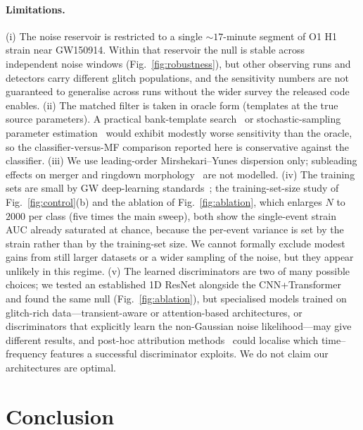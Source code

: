 \documentclass[11pt,a4paper]{article}
\begin{document}
\paragraph{Limitations.}\label{sec:limitations}
(i) The noise reservoir is restricted to a single $\sim 17$-minute
segment of O1 H1 strain near GW150914. Within that reservoir the null is
stable across independent noise windows (Fig.~\ref{fig:robustness}), but
other observing runs and detectors carry different glitch populations, and
the sensitivity numbers are not guaranteed to generalise across runs
without the wider survey the released code enables.
(ii) The matched filter is taken in oracle form (templates at the true
source parameters). A practical bank-template search~\cite{Usman2016_PyCBC}
or stochastic-sampling parameter estimation~\cite{Ashton2019} would
exhibit modestly worse sensitivity than the oracle, so the
classifier-versus-MF comparison reported here is conservative against
the classifier.
(iii) We use leading-order Mirshekari--Yunes dispersion only; subleading
effects on merger and ringdown morphology~\cite{YunesPretorius2009} are
not modelled.
(iv) The training sets are small by GW deep-learning
standards~\cite{GeorgeHuerta2018,Gabbard2018}; the training-set-size study
of Fig.~\ref{fig:control}(b) and the ablation of Fig.~\ref{fig:ablation},
which enlarges $N$ to $2000$ per class (five times the main sweep), both
show the single-event strain AUC already saturated at chance, because the
per-event variance is set by the strain rather than by the training-set
size. We cannot formally exclude modest gains from still larger datasets
or a wider sampling of the noise, but they appear unlikely in this regime.
(v) The learned discriminators are two of many possible choices; we tested
an established 1D ResNet alongside the CNN+Transformer and found the same
null (Fig.~\ref{fig:ablation}), but specialised models trained on
glitch-rich data---transient-aware or attention-based architectures, or
discriminators that explicitly learn the non-Gaussian noise likelihood---may
give different results, and post-hoc attribution methods~\cite{SHAP2017}
could localise which time--frequency features a successful discriminator
exploits. We do not claim our architectures are optimal.

\section{Conclusion}\label{sec:conclusion}
\end{document}
